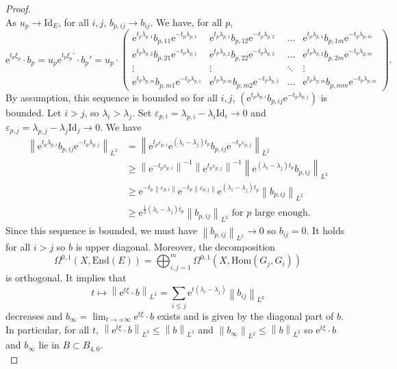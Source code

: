 \documentclass[10pt,a4paper]{amsart}
\newcommand{\End}{\mathrm{End}}
\newcommand{\Hom}{\mathrm{Hom}}
\newcommand{\Id}{\mathrm{Id}}
\newcommand{\e}{\boldsymbol{\mathrm{e}}}
\newcommand{\norme}[1]{\left\| #1 \right\|}
\renewcommand{\geq}{\geqslant}
\renewcommand{\leq}{\leqslant}
\begin{document}
\begin{proof}
$$$$
As $u_p \rightarrow \Id_E$, for all $i,j$, $b_{p,ij} \rightarrow b_{ij}$. We have, for all $p$,
$$
\e^{t_p\xi_p} \cdot b_p = u_p\e^{t_p\xi_p'} \cdot b_p' = u_p \cdot
\begin{pmatrix}
    \e^{t_p\lambda_{p,1}}b_{p,11}\e^{-t_p\lambda_{p,1}} & \e^{t_p\lambda_{p,1}}b_{p,12}\e^{-t_p\lambda_{p,2}} & \hdots & \e^{t_p\lambda_{p,1}}b_{p,1m}\e^{-t_p\lambda_{p,m}}\\
    \e^{t_p\lambda_{p,2}}b_{p,21}\e^{-t_p\lambda_{p,1}} & \e^{t_p\lambda_{p,2}}b_{p,22}\e^{-t_p\lambda_{p,2}} & \hdots & \e^{t_p\lambda_{p,2}}b_{p,2m}\e^{-t_p\lambda_{p,m}}\\
    \vdots & \vdots & \ddots & \vdots\\
    \e^{t_p\lambda_{p,m}}b_{p,m1}\e^{-t_p\lambda_{p,1}} & \e^{t_p\lambda_{p,m}}b_{p,m2}\e^{-t_p\lambda_{p,2}} & \hdots & \e^{t_p\lambda_{p,m}}b_{p,mm}\e^{-t_p\lambda_{p,m}}
\end{pmatrix}.
$$
By assumption, this sequence is bounded so for all $i,j$, $(\e^{t_p\lambda_{p,i}}b_{p,ij}\e^{-t_p\lambda_{p,j}})$ is bounded. Let $i > j$, so $\lambda_i > \lambda_j$. Set $\varepsilon_{p,i} = \lambda_{p,i} - \lambda_i\Id_i \rightarrow 0$ and $\varepsilon_{p,j} = \lambda_{p,j} - \lambda_j\Id_j \rightarrow 0$. We have
\begin{align*}
    \norme{\e^{t_p\lambda_{p,i}}b_{p,ij}\e^{-t_p\lambda_{p,j}}}_{L^2} & = \norme{\e^{t_p\varepsilon_{p,i}}\e^{(\lambda_i - \lambda_j)t_p}b_{p,ij}\e^{-t_p\varepsilon_{p,j}}}_{L^2}\\
    & \geq \norme{\e^{-t_p\varepsilon_{p,i}}}^{-1}\norme{\e^{t_p\varepsilon_{p,j}}}^{-1}\norme{\e^{(\lambda_i - \lambda_j)t_p}b_{p,ij}}_{L^2}\\
    & \geq \e^{-t_p\norme{\varepsilon_{p,i}}}\e^{-t_p\norme{\varepsilon_{p,j}}}\e^{(\lambda_i - \lambda_j)t_p}\norme{b_{p,ij}}_{L^2}\\
    & \geq \e^{\frac{1}{2}(\lambda_i - \lambda_j)t_p}\norme{b_{p,ij}}_{L^2} \textrm{ for $p$ large enough.}
\end{align*}
Since this sequence is bounded, we must have $\norme{b_{p,ij}}_{L^2} \rightarrow 0$ so $b_{ij} = 0$. It holds for all $i > j$ so $b$ is upper diagonal. Moreover, the decomposition
$$
\Omega^{0,1}(X,\End(E)) = \bigoplus_{i,j = 1}^m \Omega^{0,1}(X,\Hom(G_j,G_i))
$$
is orthogonal. It implies that
$$
t \mapsto \norme{\e^{t\xi} \cdot b}_{L^2} = \sum_{i \leq j} \e^{t(\lambda_i - \lambda_j)}\norme{b_{ij}}_{L^2}
$$
decreases and $b_\infty = \lim_{t \rightarrow +\infty} \e^{t\xi} \cdot b$ exists and is given by the diagonal part of $b$. In particular, for all $t$, $\norme{\e^{t\xi} \cdot b}_{L^2} \leq \norme{b}_{L^2}$ and $\norme{b_\infty}_{L^2} \leq \norme{b}_{L^2}$ so $\e^{t\xi} \cdot b$ and $b_\infty$ lie in $B \subset B_{4,0}$.\\


\end{proof}
\end{document}
